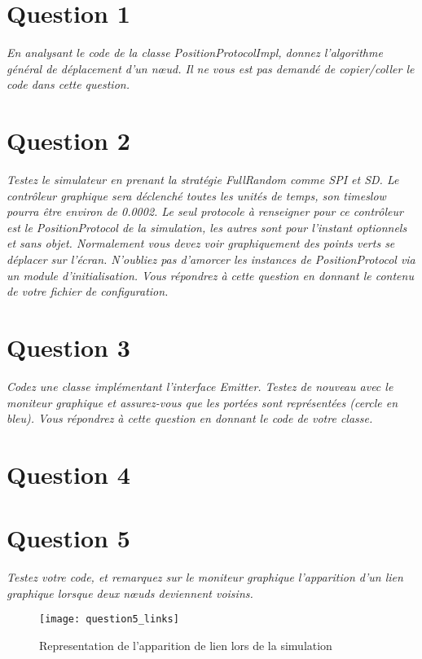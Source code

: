 \documentclass[11pt,a4paper,sans]{report}
\begin{document}
\section{Question 1}
\textit{En analysant le code de la classe PositionProtocolImpl, donnez l’algorithme général de déplacement d’un nœud. Il ne vous est pas demandé de copier/coller le code dans cette question.}




\section{Question 2}
\textit{Testez le simulateur en prenant la stratégie FullRandom comme SPI et SD. Le contrôleur graphique sera déclenché toutes les unités de temps, son timeslow pourra être environ de 0.0002. Le seul protocole à renseigner pour ce contrôleur est le PositionProtocol de la simulation, les autres sont pour l’instant optionnels et sans objet.  Normalement vous devez voir graphiquement des points verts se déplacer sur l’écran.  N’oubliez pas d’amorcer les instances de PositionProtocol via un module d’initialisation. Vous répondrez à cette question en donnant le contenu de votre fichier de configuration.}

\section{Question 3}
\textit{Codez une classe implémentant l’interface Emitter. Testez de nouveau avec le moniteur graphique et assurez-vous que les portées sont représentées (cercle en bleu).  Vous répondrez à cette question en donnant le code de votre classe.}
%


\section{Question 4}

\section{Question 5}
\par\textit{Testez votre code, et remarquez sur le moniteur graphique l’apparition d’un lien graphique lorsque deux nœuds deviennent voisins.}
\begin{figure}[h]
    \centering
    \texttt{[image: question5\_links]}
    \caption{Representation de l'apparition de lien lors de la simulation}
    \label{fig:mesh1}
\end{figure}
\end{document}
